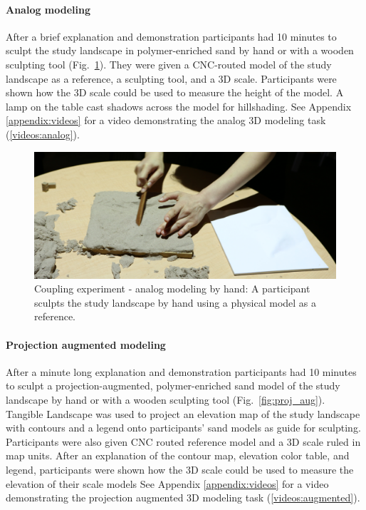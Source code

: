 \documentclass[prodmode,acmtochi]{acmsmall} %
\begin{document}
\paragraph{Analog modeling}

After a brief explanation and demonstration
participants had 10 minutes to sculpt the study landscape in polymer-enriched sand 
by hand or with a wooden sculpting tool (Fig.~\ref{fig:analog}).  
They were given a CNC-routed model of the study landscape 
as a reference, a sculpting tool, and a 3D scale. 
Participants were shown how the 3D scale could be used to 
measure the height of the model. 
A lamp on the table cast shadows across the model for hillshading.
%
See Appendix \ref{appendix:videos}
for a video demonstrating the analog 3D modeling task (\ref{videos:analog}).

\begin{figure}
\begin{center}
	\includegraphics[width=\textwidth]{images/experiments/connie_analog_1.jpg}
	\caption{Coupling experiment - analog modeling by hand:
	A participant sculpts the study landscape by hand
	using a physical model as a reference.}
	\label{fig:analog}
\end{center}
\end{figure}

\paragraph{Projection augmented modeling}
After a minute long explanation and demonstration
participants had 10 minutes to sculpt
a projection-augmented, polymer-enriched sand model
of the study landscape by hand or with a wooden sculpting tool 
(Fig.~\ref{fig:proj_aug}). 
Tangible Landscape was used to project 
an elevation map of the study landscape
with contours and a legend
onto participants' sand models as guide for sculpting. 
Participants were also given CNC routed reference model and 
a 3D scale ruled in map units. 
After an explanation of the contour map, elevation color table, and legend,
participants were shown how the 3D scale could be used to 
measure the elevation of their scale models
%
See Appendix \ref{appendix:videos}
for a video demonstrating the projection augmented 3D modeling task (\ref{videos:augmented}).
\end{document}

